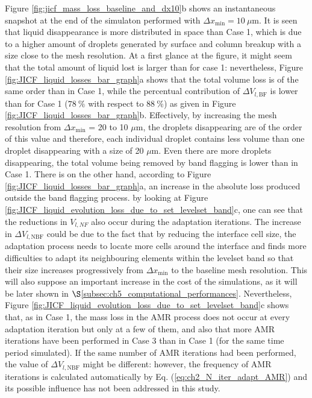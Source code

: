Figure \ref{fig:jicf_mass_loss_baseline_and_dx10}b shows an instantaneous snapshot at the end of the simulaton performed with $\Delta x_\mathrm{min} = 10~\mu$m. It is seen that liquid disappearance is more distributed in space than Case 1, which is due to a higher amount of droplets generated by surface and column breakup with a size close to the mesh resolution. At a first glance at the figure, it might seem that the total amount of liquid lost is larger than for case 1: nevertheless, Figure \ref{fig:JICF_liquid_losses_bar_graph}a shows that the total volume loss is of the same order than in Case 1, while the percentual contribution of $\Delta V_{l,\mathrm{BF}}$ is lower than for Case 1 ($78~\%$ with respect to $88~\%$) as given in Figure  \ref{fig:JICF_liquid_losses_bar_graph}b. Effectively, by increasing the mesh resolution from $\Delta x_\mathrm{min}$ = 20 to 10 $\mu$m, the droplets disappearing are of the order of this value and therefore, each individual droplet contains less volume than one droplet disappearing with a size of 20 $\mu$m. Even there are more droplets disappearing, the total volume being removed by band flagging is lower than in Case 1. There is on the other hand, according to Figure \ref{fig:JICF_liquid_losses_bar_graph}a, an increase in the absolute loss produced outside the band flagging process. by looking at Figure \ref{fig:JICF_liquid_evolution_loss_due_to_set_levelset_band}c, one can see that the reductions in $V_{l,NF}$ also occur during the adaptation iterations. The increase in $\Delta V_{l,\mathrm{NBF}}$ could be due to the fact that by reducing the interface cell size, the adaptation process needs to locate more cells around the interface and finds more difficulties to adapt its neighbouring elements within the levelset band so that their size increases progressively from $\Delta x_\mathrm{min}$ to the baseline mesh resolution. This will also suppose an important increase in the cost of the simulations, as it will be later shown in $\S$\ref{subsec:ch5_computational_performances}. Nevertheless, Figure \ref{fig:JICF_liquid_evolution_loss_due_to_set_levelset_band}c shows that, as in Case 1, the mass loss in the AMR process does not occur at every adaptation iteration but only at a few of them, and also that more AMR iterations have been performed in Case 3 than in Case 1 (for the same time period simulated). If the same number of AMR iterations had been performed, the value of $\Delta V_{l,\mathrm{NBF}}$ might be different: however, the frequency of AMR iterations is calculated automatically by Eq. (\ref{eq:ch2_N_iter_adapt_AMR}) and its possible influence has not been addressed in this study. 




